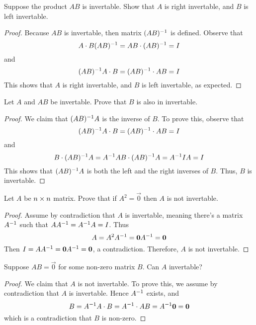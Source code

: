 \begin{exercise}
  Suppose the product $AB$ is invertable. Show that $A$ is right 
  invertable, and $B$ is left invertable.
\end{exercise}
\begin{proof}
  Because $AB$ is invertable, then matrix $(AB)^{-1}$ is defined.
  Observe that
  \[ A\cdot B(AB)^{-1}=AB\cdot(AB)^{-1}=I \] and 
  \[ (AB)^{-1} A\cdot B=(AB)^{-1}\cdot AB=I\]
  This shows that $A$ is right invertable, and $B$ is left invertable,
  as expected.
\end{proof}
\begin{exercise}
  Let $A$ and $AB$ be invertable. Prove that $B$ is also in invertable.
\end{exercise}
\begin{proof}
  We claim that $(AB)^{-1} A$ is the inverse of $B$. To prove this,
  observe that 
  \[
    (AB)^{-1} A\cdot B=(AB)^{-1}\cdot AB=I
  \] and
  \[
    B\cdot (AB)^{-1} A=A^{-1} AB\cdot (AB)^{-1} A=A^{-1} IA=I
  \]
  This shows that $(AB)^{-1} A$ is both the left and the right inverses
  of $B$. Thus, $B$ is invertable.
\end{proof}
\begin{exercise}
  Let $A$ be $n\times n$ matrix. Prove that if $A^2=\vec{0}$ then 
  $A$ is not invertable.
\end{exercise}
\begin{proof}
  Assume by contradiction that $A$ is invertable, meaning there's a
  matrix $A^{-1}$ such that $AA^{-1}=A^{-1} A=I$. Thus
  \[
    A=A^2A^{-1}=\mathbf{0}A^{-1}=\mathbf{0}
  \]
  Then $I=AA^{-1}=\mathbf{0}A^{-1}=\mathbf{0}$, a contradiction. Therefore,
  $A$ is not invertable.
\end{proof}
\begin{exercise}
  Suppose $AB=\vec{0}$ for some non-zero matrix $B$. Can $A$ invertable?
\end{exercise}
\begin{proof}
  We claim that $A$ is not invertable. To prove this, we assume by
  contradiction that $A$ is invertable. Hence $A^{-1}$ exists, and
  \[
    B=A^{-1} A\cdot B=A^{-1}\cdot AB=A^{-1}\mathbf{0}=\mathbf{0}
  \]
  which is a contradiction that $B$ is non-zero.
\end{proof}
